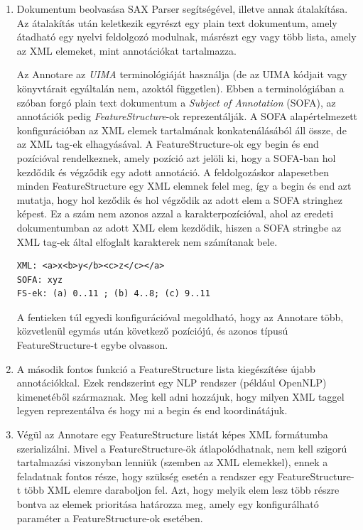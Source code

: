 \begin{enumerate}
\item Dokumentum beolvasása SAX Parser segítségével, illetve annak átalakítása. Az átalakítás után keletkezik egyrészt egy plain text dokumentum, amely átadható egy nyelvi feldolgozó modulnak, másrészt egy vagy több lista, amely az XML elemeket, mint annotációkat tartalmazza. 

Az Annotare az \textit{UIMA} terminológiáját használja (de az UIMA kódjait vagy könyvtárait egyáltalán nem, azoktól független). Ebben a terminológiában a szóban forgó plain text dokumentum a \textit{Subject of Annotation} (SOFA), az annotációk pedig \textit{FeatureStructure}-ok reprezentálják. A SOFA alapértelmezett konfigurációban az XML elemek tartalmának konkatenálásából áll össze, de az XML tag-ek elhagyásával. A FeatureStructure-ok egy begin és end pozícióval rendelkeznek, amely pozíció azt jelöli ki, hogy a SOFA-ban hol kezdődik és végződik egy adott annotáció. A feldolgozáskor alapesetben minden FeatureStructure egy XML elemnek felel meg, így a begin és end azt mutatja, hogy hol keződik és hol végződik az adott elem a SOFA stringhez képest. Ez a szám nem azonos azzal a karakterpozícióval, ahol az eredeti dokumentumban az adott XML elem kezdődik, hiszen a SOFA stringbe az XML tag-ek által elfoglalt karakterek nem számítanak bele. 

\begin{lstlisting}[label={lst:annotare}, caption=Példa az XML\, SOFA és FeatureStructure kapcsolatára,breaklines=true]
XML: <a>x<b>y</b><c>z</c></a>
SOFA: xyz
FS-ek: (a) 0..11 ; (b) 4..8; (c) 9..11
\end{lstlisting}

A fentieken túl egyedi konfigurációval megoldható, hogy az Annotare több, közvetlenül egymás után következő pozíciójú, és azonos típusú FeatureStructure-t egybe olvasson.

\item A második fontos funkció a FeatureStructure lista kiegészítése újabb annotációkkal. Ezek rendszerint egy NLP rendszer (például OpenNLP) kimenetéből származnak. Meg kell adni hozzájuk, hogy milyen XML taggel legyen reprezentálva és hogy mi a begin és end koordinátájuk.

\item Végül az Annotare egy FeatureStructure listát képes XML formátumba szerializálni. Mivel a FeatureStructure-ök átlapolódhatnak, nem kell szigorú tartalmazási viszonyban lenniük (szemben az XML elemekkel), ennek a feladatnak fontos része, hogy szükség esetén a rendszer egy FeatureStructure-t több XML elemre daraboljon fel. Azt, hogy melyik elem lesz több részre bontva az elemek prioritása határozza meg, amely egy konfigurálható paraméter a FeatureStructure-ok esetében.
\end{enumerate} 

